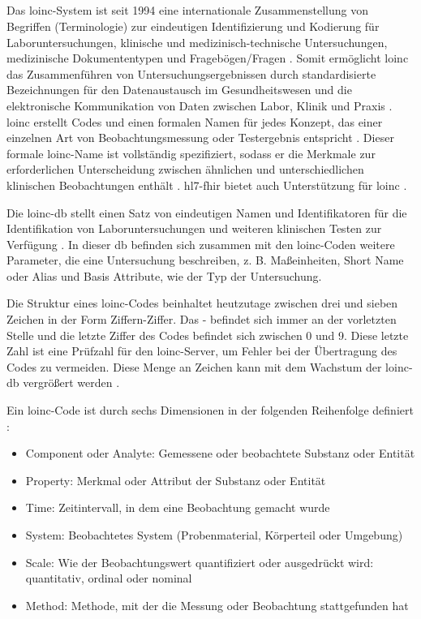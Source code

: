 \subsection{} \label{subsec:loinc}

Das \acf{loinc}-System ist seit 1994 eine internationale Zusammenstellung von Begriffen (Terminologie) zur eindeutigen Identifizierung und Kodierung für Laboruntersuchungen, klinische und medizinisch-technische Untersuchungen, medizinische Dokumententypen und Fragebögen/Fragen \cite{loincbfarm, loincpaper}. Somit ermöglicht \ac{loinc} das Zusammenführen von Untersuchungsergebnissen durch standardisierte Bezeichnungen für den Datenaustausch im Gesundheitswesen und die elektronische Kommunikation von Daten zwischen Labor, Klinik und Praxis \cite{interop}. \ac{loinc} erstellt Codes und einen formalen Namen für jedes Konzept, das einer einzelnen Art von Beobachtungsmessung oder Testergebnis entspricht \cite{interop}. Dieser formale \ac{loinc}-Name ist vollständig spezifiziert, sodass er die Merkmale zur erforderlichen Unterscheidung zwischen ähnlichen und unterschiedlichen klinischen Beobachtungen enthält \cite{telemedizin}. \ac{hl7}-\ac{fhir} bietet auch Unterstützung für \ac{loinc} \cite{loincpaper}.

Die \ac{loinc}-\ac{db} stellt einen Satz von eindeutigen Namen und Identifikatoren für die Identifikation von Laboruntersuchungen und weiteren klinischen Testen zur Verfügung \cite{loincbas}. In dieser \ac{db} befinden sich zusammen mit den \ac{loinc}-Coden weitere Parameter, die eine Untersuchung beschreiben, z. B. Maßeinheiten, \glqq Short Name\grqq{} oder Alias und Basis Attribute, wie der Typ der Untersuchung.

Die Struktur eines \ac{loinc}-Codes beinhaltet heutzutage zwischen drei und sieben Zeichen in der Form \glqq Ziffern-Ziffer\grqq{}. Das \glqq-\grqq{} befindet sich immer an der vorletzten Stelle und die letzte Ziffer des Codes befindet sich zwischen 0 und 9. Diese letzte Zahl ist eine Prüfzahl für den \ac{loinc}-Server, um Fehler bei der Übertragung des Codes zu vermeiden. Diese Menge an Zeichen kann mit dem Wachstum der \ac{loinc}-\ac{db} vergrößert werden \cite{loincoffi}.

Ein \ac{loinc}-Code ist durch sechs Dimensionen in der folgenden Reihenfolge definiert \cite{loincbfarm}: 
\begin{itemize}
	\item Component oder Analyte: Gemessene oder beobachtete Substanz oder Entität
	\item Property: Merkmal oder Attribut der Substanz oder Entität
	\item Time: Zeitintervall, in dem eine Beobachtung gemacht wurde
	\item System: Beobachtetes System (Probenmaterial, Körperteil oder Umgebung)
	\item Scale: Wie der Beobachtungswert quantifiziert oder ausgedrückt wird: quantitativ, ordinal oder nominal
	\item Method: Methode, mit der die Messung oder Beobachtung stattgefunden hat
\end{itemize}

